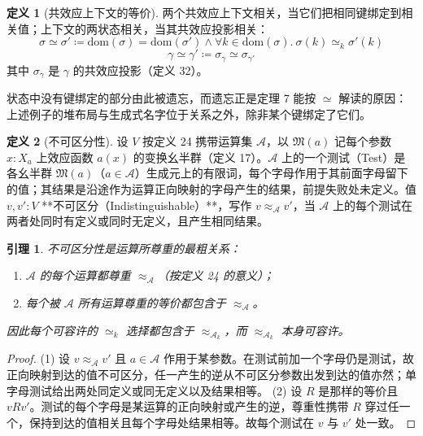 \documentclass[11pt,a4paper]{article}
\theoremstyle{plain}
\newtheorem{lemma}[theorem]{引理}
\theoremstyle{definition}
\newtheorem{definition}{定义}
\theoremstyle{remark}
\begin{document}
\begin{definition}[共效应上下文的等价]
两个共效应上下文相关，当它们把相同键绑定到相关值；上下文的两状态相关，当其共效应投影相关：
\[
\sigma \simeq \sigma' \coloneqq \mathrm{dom}(\sigma) = \mathrm{dom}(\sigma') \wedge \forall k \in \mathrm{dom}(\sigma).\ \sigma(k) \simeq_k \sigma'(k)
\]
\[
\gamma \simeq \gamma' \coloneqq \sigma_\gamma \simeq \sigma_{\gamma'} \tag{32}
\]
其中 $\sigma_\gamma$ 是 $\gamma$ 的共效应投影（定义 32）。
\end{definition}

状态中没有键绑定的部分由此被遗忘，而遗忘正是定理 7 能按 $\simeq$ 解读的原因：上述例子的堆布局与生成式名字位于关系之外，除非某个键绑定了它们。

\begin{definition}[不可区分性]
设 $V$ 按定义 24 携带运算集 $\mathcal{A}$，以 $\mathfrak{M}(a)$ 记每个参数 $x : X_a$ 上效应函数 $a(x)$ 的变换幺半群（定义 17）。$\mathcal{A}$ 上的一个测试（Test）是各幺半群 $\mathfrak{M}(a)$（$a \in \mathcal{A}$）生成元上的有限词，每个字母作用于其前面字母留下的值；其结果是沿途作为运算正向映射的字母产生的结果，前提失败处未定义。值 $v, v' : V$ **不可区分（Indistinguishable）**，写作 $v \approx_{\mathcal{A}} v'$，当 $\mathcal{A}$ 上的每个测试在两者处同时有定义或同时无定义，且产生相同结果。
\end{definition}

\begin{lemma}
不可区分性是运算所尊重的最粗关系：
\begin{enumerate}
\item $\mathcal{A}$ 的每个运算都尊重 $\approx_\mathcal{A}$（按定义 24 的意义）；
\item 每个被 $\mathcal{A}$ 所有运算尊重的等价都包含于 $\approx_\mathcal{A}$。
\end{enumerate}
因此每个可容许的 $\simeq_k$ 选择都包含于 $\approx_{\mathcal{A}_k}$，而 $\approx_{\mathcal{A}_k}$ 本身可容许。
\end{lemma}

\begin{proof}
(1) 设 $v \approx_\mathcal{A} v'$ 且 $a \in \mathcal{A}$ 作用于某参数。在测试前加一个字母仍是测试，故正向映射到达的值不可区分，任一产生的逆从不可区分参数出发到达的值亦然；单字母测试给出两处同定义或同无定义以及结果相等。
(2) 设 $R$ 是那样的等价且 $v R v'$。测试的每个字母是某运算的正向映射或产生的逆，尊重性携带 $R$ 穿过任一个，保持到达的值相关且每个字母处结果相等。故每个测试在 $v$ 与 $v'$ 处一致。
\end{proof}
\end{document}
